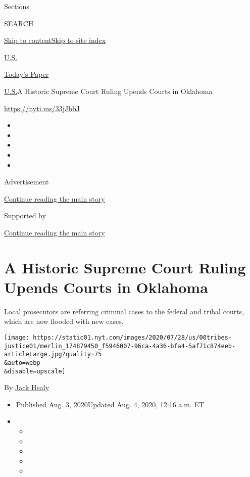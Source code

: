 Sections

SEARCH

\protect\hyperlink{site-content}{Skip to
content}\protect\hyperlink{site-index}{Skip to site index}

\href{https://www.nytimes.com/section/us}{U.S.}

\href{https://myaccount.nytimes.com/auth/login?response_type=cookie\&client_id=vi}{}

\href{https://www.nytimes.com/section/todayspaper}{Today's Paper}

\href{/section/us}{U.S.}\textbar{}A Historic Supreme Court Ruling Upends
Courts in Oklahoma

\url{https://nyti.ms/33jJbbJ}

\begin{itemize}
\item
\item
\item
\item
\item
\end{itemize}

Advertisement

\protect\hyperlink{after-top}{Continue reading the main story}

Supported by

\protect\hyperlink{after-sponsor}{Continue reading the main story}

\hypertarget{a-historic-supreme-court-ruling-upends-courts-in-oklahoma}{%
\section{A Historic Supreme Court Ruling Upends Courts in
Oklahoma}\label{a-historic-supreme-court-ruling-upends-courts-in-oklahoma}}

Local prosecutors are referring criminal cases to the federal and tribal
courts, which are now flooded with new cases.

\texttt{[image: https://static01.nyt.com/images/2020/07/28/us/00tribes-justice01/merlin\_174879450\_f5946007-96ca-4a36-bfa4-5af71c874eeb-articleLarge.jpg?quality=75\\\&auto=webp\\\&disable=upscale]}

By \href{https://www.nytimes.com/by/jack-healy}{Jack Healy}

\begin{itemize}
\item
  Published Aug. 3, 2020Updated Aug. 4, 2020, 12:16 a.m. ET
\item
  \begin{itemize}
  \item
  \item
  \item
  \item
  \item
  \end{itemize}
\end{itemize}

